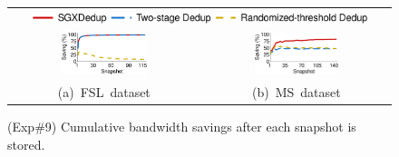 \begin{figure}[t]
\centering
\begin{tabular}{@{\ }c@{\ }c}
\multicolumn{2}{c}{\includegraphics[width=0.9\textwidth]{pic/sgxdedup/upload_traffic_legend.pdf}} \\
\hspace{-0.1in}
\includegraphics[width=0.47\textwidth]{pic/sgxdedup/upload_traffic_fsl.pdf} &
\includegraphics[width=0.47\textwidth]{pic/sgxdedup/upload_traffic_ms.pdf}
\vspace{-3pt}\\ 
\mbox{\small (a) FSL dataset} &
\mbox{\small (b) MS dataset}
\end{tabular}
\vspace{-6pt}
\caption{(Exp\#9) Cumulative bandwidth savings after each snapshot is stored.}
\label{fig:sgxdedup-uploadTraffic}
\end{figure}

